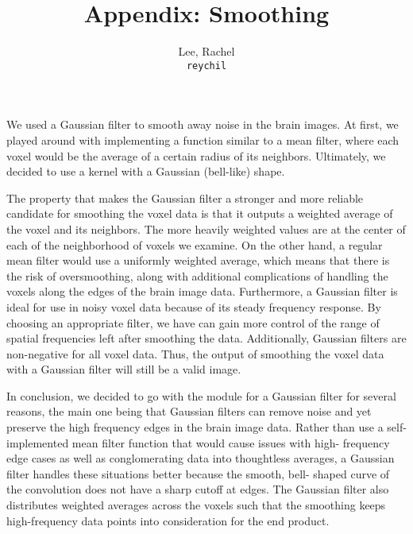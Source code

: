 \documentclass[11pt]{article}
\title{Appendix: Smoothing}
\author{
  Lee, Rachel\\
  \texttt{reychil}
}
\begin{document}
\maketitle

\par \indent We used a Gaussian filter to smooth away noise in the brain 
images. At first, we played around with implementing a function similar 
to a mean filter, where each voxel would be the average of a certain radius 
of its neighbors. Ultimately, we decided to use a kernel with a Gaussian 
(bell-like) shape. 

\par The property that makes the Gaussian filter a stronger and more 
reliable candidate for smoothing the voxel data is that it outputs a weighted 
average of the voxel and its neighbors. The more heavily weighted values are 
at the center of each of the neighborhood of voxels we examine. On the other 
hand, a regular mean filter would use a uniformly weighted average, which 
means that there is the risk of oversmoothing, along with additional 
complications of handling the voxels along the edges of the brain image data. 
Furthermore, a Gaussian filter is ideal for use in noisy voxel data because of 
its steady frequency response. By choosing an appropriate filter, we have can 
gain more control of the range of spatial frequencies left after smoothing 
the data. Additionally, Gaussian filters are non-negative for all voxel data. 
Thus, the output of smoothing the voxel data with a Gaussian filter will still 
be a valid image. 

\par In conclusion, we decided to go with the module for a Gaussian filter for 
several reasons, the main one being that Gaussian filters can remove noise and 
yet preserve the high frequency edges in the brain image data. Rather than use 
a self-implemented mean filter function that would cause issues with high-
frequency edge cases as well as conglomerating data into thoughtless averages, 
a Gaussian filter handles these situations better because the smooth, bell-
shaped curve of the convolution does not have a sharp cutoff at edges. The 
Gaussian filter also distributes weighted averages across the voxels such that 
the smoothing keeps high-frequency data points into consideration for the end 
product.


\end{document}
